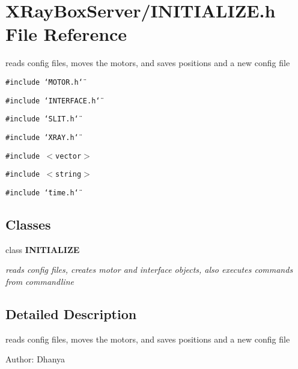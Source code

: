 \section{XRay\-Box\-Server/INITIALIZE.h File Reference}
\label{INITIALIZE_8h}
reads config files, moves the motors, and saves positions and a new config file 

{\tt \#include \char`\"{}MOTOR.h\char`\"{}}\par
{\tt \#include \char`\"{}INTERFACE.h\char`\"{}}\par
{\tt \#include \char`\"{}SLIT.h\char`\"{}}\par
{\tt \#include \char`\"{}XRAY.h\char`\"{}}\par
{\tt \#include $<$vector$>$}\par
{\tt \#include $<$string$>$}\par
{\tt \#include \char`\"{}time.h\char`\"{}}\par
\subsection*{Classes}
\begin{CompactItemize}
\item 
class \bf{INITIALIZE}
\begin{CompactList}\small\item\em reads config files, creates motor and interface objects, also executes commands from commandline \item\end{CompactList}\end{CompactItemize}


\subsection{Detailed Description}
reads config files, moves the motors, and saves positions and a new config file 

\begin{Desc}
\item[Author:]Dhanya \end{Desc}

